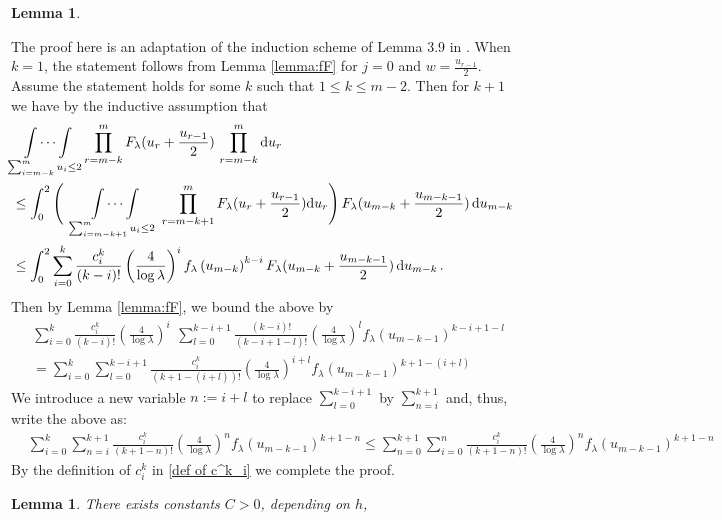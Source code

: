 \documentclass[a4paper,reqno,11pt]{amsart}
\makeatletter
\renewenvironment{proof}[1][\proofname]{\par
\pushQED{\qed}%
\normalfont \topsep4\p@\@plus4\p@\relax
\trivlist
\item[\hskip\labelsep
\bfseries
#1\@addpunct{.}]\ignorespaces
}{%
\popQED\endtrivlist\@endpefalse
}
\numberwithin{equation}{section}
\theoremstyle{mytheorem}
\newtheorem{lemma}[theorem]{Lemma}
\newcommand{\gl}{\lambda}
\newcommand\ra{\left(}
\newcommand\rb{\right)}
\newcommand\dd{\mathrm{d}}
\newcommand{\f}{\frac}
\makeatother
\begin{document}
{\begin{lemma}
\end{lemma}
\begin{proof}
    The proof here is an adaptation of the induction scheme of Lemma 3.9 in \cite{CZ23}. 
    When $k=1$, the statement follows from Lemma \ref{lemma:fF} for $j=0$ and $w=\frac{u_{r-1}}{2}$.  
    Assume the statement holds for some $k$ such that $1\le k\le m-2$. Then for $k+1$ we have by the
     inductive assumption that 
    \begin{equation}
    \begin{split}
    & \idotsint\limits_{\sum_{i=m-k}^m u_i\le 2}
     \prod^m_{r=m-k} F_\gl(u_r+\f{u_{r-1}}{2}) \, \prod^m_{r=m-k} \dd u_r\\
    & \le \int^{2}_0
        \Bigg( \,\,\,\,
        \idotsint\limits_{\sum_{i=m-k+1}^m u_i\le 2} \,\,
        \prod_{r=m-k+1}^m 
        F_\gl(u_r+\f{u_{r-1}}{2}) \dd u_r 
        \Bigg) \,
        F_\gl(u_{m-k}+\f{u_{m-k-1}}{2}) \, \dd u_{m-k}\\
        & \le 
        \int^{2}_0
        \sum^k_{i=0}\frac{c^k_i}{(k-i)!}
        \ra
        \frac{4}{\log\gl}
        \rb^i
        f_\gl
        \ra
        u_{m-k}
        \rb^{k-i}
        F_\gl(u_{m-k}+\f{u_{m-k-1}}{2}) \, \dd u_{m-k} \,.
    \end{split}
    \end{equation}
    Then by Lemma \ref{lemma:fF}, we bound the above by
    \begin{align*}
        & \sum^k_{i=0} \f{c^k_i}{(k-i)!} \ra \f{4}{\log\gl} \rb^i \,\ \sum^{k-i+1}_{l=0} \f{(k-i)!}{(k-i+1-l)!} \ra \f{4}{\log\gl} \rb^l f_\gl \ra u_{m-k-1} \rb^{k-i+1-l} \\
        & = \sum^k_{i=0} \sum^{k-i+1}_{l=0} \f{c^k_i}{(k+1-(i+l))!} \ra \f{4}{\log\gl} \rb^{i+l} f_\gl \ra u_{m-k-1} \rb^{k+1-(i+l)} 
    \end{align*}
    We introduce a new variable $n:=i+l$ to replace $\sum_{l=0}^{k-i+1}$ by $\sum_{n=i}^{k+1}$ and, thus, write the above as:
    \begin{align*}
        &  \sum^k_{i=0} \sum_{n=i}^{k+1} \f{c^k_i}{(k+1-n)!} \ra \f{4}{\log\gl} \rb^{n} f_\gl \ra u_{m-k-1} \rb^{k+1-n} 
         \le \sum_{n=0}^{k+1} \sum_{i=0}^{n} \f{c^k_i}{(k+1-n)!} \ra \f{4}{\log\gl} \rb^{n} f_\gl \ra u_{m-k-1} \rb^{k+1-n}
    \end{align*}
    By the definition of $c^k_i$ in \eqref{def of c^k_i} we complete the proof.
    \color{black}
\end{proof}
\begin{lemma}\label{after u, prop}
There exists constants $C>0$, depending on $h$,

\end{lemma}}
\end{document}

